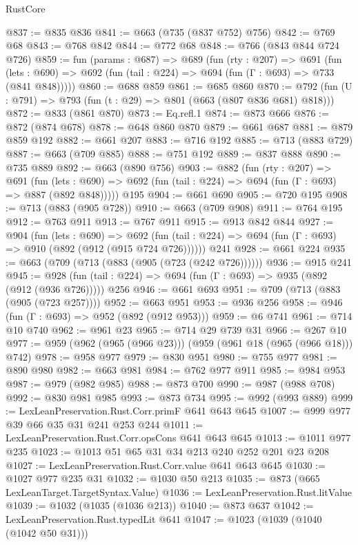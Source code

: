 \begin{lexlean}{RustCore}
\begin{coremodule}
@837 := @835 @836
@841 := @663 (@735 (@837 @752) @756)
@842 := @769 @68
@843 := @768 @842
@844 := @772 @68
@848 := @766 (@843 @844 @724 @726)
@859 := fun (params : @687) =>
  @689
    (fun (rty : @207) =>
    @691
      (fun (lets : @690) => @692 (fun (tail : @224) => @694 (fun (Γ : @693) => @733 (@841 @848)))))
@860 := @688 @859
@861 := @685 @860
@870 := @792 (fun (U : @791) => @793 (fun (t : @29) => @801 (@663 (@807 @836 @681) @818)))
@872 := @833 (@861 @870)
@873 := Eq.refl.{1}
@874 := @873 @666
@876 := @872 (@874 @678)
@878 := @648 @860 @870
@879 := @661 @687
@881 := @879 @859 @192
@882 := @661 @207
@883 := @716 @192
@885 := @713 (@883 @729)
@887 := @663 (@709 @885)
@888 := @751 @192
@889 := @837 @888
@890 := @735 @889
@892 := @663 (@890 @756)
@903 := @882
    (fun (rty : @207) =>
    @691
      (fun (lets : @690) => @692 (fun (tail : @224) => @694 (fun (Γ : @693) => @887 (@892 @848)))))
    @195
@904 := @661 @690
@905 := @720 @195
@908 := @713 (@883 (@905 @728))
@910 := @663 (@709 @908)
@911 := @764 @195
@912 := @763 @911
@913 := @767 @911
@915 := @913 @842 @844
@927 := @904
    (fun (lets : @690) =>
    @692 (fun (tail : @224) => @694 (fun (Γ : @693) => @910 (@892 (@912 (@915 @724 @726))))))
    @241
@928 := @661 @224
@935 := @663 (@709 (@713 (@883 (@905 (@723 (@242 @726))))))
@936 := @915 @241
@945 := @928 (fun (tail : @224) => @694 (fun (Γ : @693) => @935 (@892 (@912 (@936 @726))))) @256
@946 := @661 @693
@951 := @709 (@713 (@883 (@905 (@723 @257))))
@952 := @663 @951
@953 := @936 @256
@958 := @946 (fun (Γ : @693) => @952 (@892 (@912 @953)))
@959 := @6 @741
@961 := @714 @10 @740
@962 := @961 @23
@965 := @714 @29 @739 @31
@966 := @267 @10
@977 := @959 (@962 (@965 (@966 @23))) (@959 (@961 @18 (@965 (@966 @18))) @742)
@978 := @958 @977
@979 := @830 @951
@980 := @755 @977
@981 := @890 @980
@982 := @663 @981
@984 := @762 @977 @911
@985 := @984 @953
@987 := @979 (@982 @985)
@988 := @873 @700
@990 := @987 (@988 @708)
@992 := @830 @981 @985
@993 := @873 @734
@995 := @992 (@993 @889)
@999 := LexLeanPreservation.Rust.Corr.primF @641 @643 @645
@1007 := @999 @977 @39 @66 @35 @31 @241 @253 @244
@1011 := LexLeanPreservation.Rust.Corr.opsCons @641 @643 @645
@1013 := @1011 @977 @235
@1023 := @1013 @51 @65 @31 @34 @213 @240 @252 @201 @23 @208
@1027 := LexLeanPreservation.Rust.Corr.value @641 @643 @645
@1030 := @1027 @977 @235 @31
@1032 := @1030 @50 @213
@1035 := @873 (@665 LexLeanTarget.TargetSyntax.Value)
@1036 := LexLeanPreservation.Rust.litValue
@1039 := @1032 (@1035 (@1036 @213))
@1040 := @873 @637
@1042 := LexLeanPreservation.Rust.typedLit @641
@1047 := @1023 (@1039 (@1040 (@1042 @50 @31)))

\end{coremodule}
\end{lexlean}
